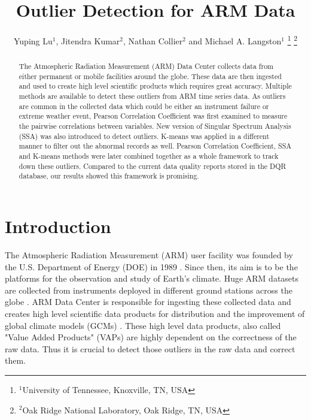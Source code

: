 \documentclass[letterpaper, 10 pt, conference]{ieeeconf}  %
\title{\LARGE \bf
Outlier Detection for ARM Data
}
\author{Yuping Lu$^{1}$, Jitendra Kumar$^{2}$, Nathan Collier$^{2}$ and Michael A. Langston$^{1}$%
\thanks{$^{1}$University of Tennessee, Knoxville, TN, USA}%
\thanks{$^{2}$Oak Ridge National Laboratory, Oak Ridge, TN, USA}%
}
\begin{document}
\maketitle
\thispagestyle{empty}
\pagestyle{empty}

\begin{abstract}

The Atmospheric Radiation Measurement (ARM) Data Center collects data from either permanent or mobile facilities around the globe. These data are then ingested and used to create high level scientific products which requires great accuracy. Multiple methods are available to detect these outliers from ARM time series data. As outliers are common in the collected data which could be either an instrument failure or extreme weather event, Pearson Correlation Coefficient was first examined to measure the pairwise correlations between variables. New version of Singular Spectrum Analysis (SSA) was also introduced to detect outliers. K-means was applied in a different manner to filter out the abnormal records as well. Pearson Correlation Coefficient, SSA and K-means methods were later combined together as a whole framework to track down these outliers. Compared to the current data quality reports stored in the DQR database, our results showed this framework is promising.

\end{abstract}


\section{Introduction}
The Atmospheric Radiation Measurement (ARM) user facility was founded by the U.S. Department of Energy (DOE) in 1989 \cite{ARM}. Since then, its aim is to be the platforms for the observation and study of Earth's climate. Huge ARM datasets are collected from instruments deployed in different ground stations across the globe \cite{stokes1994atmospheric}. ARM Data Center is responsible for ingesting these collected data and creates high level scientific data products for distribution and the improvement of global climate models (GCMs) \cite{gaustad2014scientific}. These high level data products, also called "Value Added Products" (VAPs) are highly dependent on the correctness of the raw data. Thus it is crucial to detect those outliers in the raw data and correct them.
\end{document}
